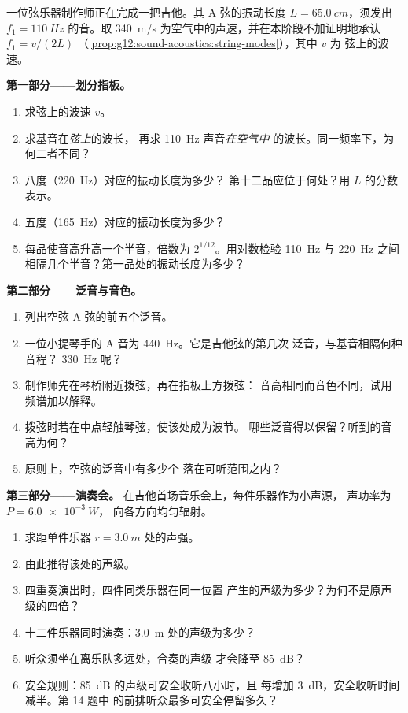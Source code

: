 \begin{problem}
\label{pb:g12:sound-acoustics:1}
一位弦乐器制作师正在完成一把吉他。其 A 弦的振动长度
$L = \qty{65.0}{cm}$，须发出 $f_1 = \qty{110}{Hz}$ 的音。取
\qty{340}{m/s} 为空气中的声速，并在本阶段不加证明地承认 $f_1 = v/(2L)$
（\cref{prop:g12:sound-acoustics:string-modes}），其中 $v$ 为
弦上的波速。

\medskip
\noindent\textbf{第一部分——划分指板。}
\begin{enumerate}
  \item 求弦上的波速 $v$。
  \item 求基音在\emph{弦上}的波长，
        再求 \qty{110}{Hz} 声音\emph{在空气中
        }的波长。同一频率下，为何二者不同？
  \item 八度（\qty{220}{Hz}）对应的振动长度为多少？
        第十二品应位于何处？用 $L$ 的分数表示。
  \item 五度（\qty{165}{Hz}）对应的振动长度为多少？
  \item 每品使音高升高一个半音，倍数为
        $2^{1/12}$。用对数检验 \qty{110}{Hz} 与 \qty{220}{Hz} 之间
        相隔几个半音？第一品处的振动长度为多少？
\end{enumerate}

\medskip
\noindent\textbf{第二部分——泛音与音色。}
\begin{enumerate}[resume]
  \item 列出空弦 A 弦的前五个泛音。
  \item 一位小提琴手的 A 音为 \qty{440}{Hz}。它是吉他弦的第几次
        泛音，与基音相隔何种音程？
        \qty{330}{Hz} 呢？
  \item 制作师先在琴桥附近拨弦，再在指板上方拨弦：
        音高相同而音色不同，试用频谱加以解释。
  \item 拨弦时若在中点轻触琴弦，使该处成为波节。
        哪些泛音得以保留？听到的音高为何？
  \item 原则上，空弦的泛音中有多少个
        落在可听范围之内？
\end{enumerate}

\medskip
\noindent\textbf{第三部分——演奏会。}
在吉他首场音乐会上，每件乐器作为小声源，
声功率为 $P = \qty{6.0e-3}{W}$，
向各方向均匀辐射。
\begin{enumerate}[resume]
  \item 求距单件乐器 $r = \qty{3.0}{m}$ 处的声强。
  \item 由此推得该处的声级。
  \item 四重奏演出时，四件同类乐器在同一位置
        产生的声级为多少？为何不是原声级的四倍？
  \item 十二件乐器同时演奏：\qty{3.0}{m} 处的声级为多少？
  \item 听众须坐在离乐队多远处，合奏的声级
        才会降至 \qty{85}{dB}？
  \item 安全规则：\qty{85}{dB} 的声级可安全收听八小时，且
        每增加 \qty{+3}{dB}，安全收听时间减半。第 14 题中
        的前排听众最多可安全停留多久？
\end{enumerate}


\end{problem}
